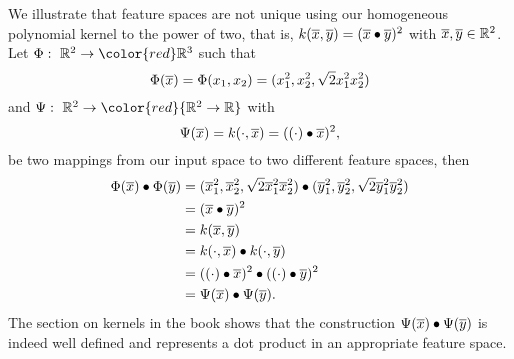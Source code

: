 \documentclass[a4paper,blends,pdf,colorBG,slideColor]{prosper}
\begin{document}
\small
We illustrate that feature spaces are not unique using our homogeneous polynomial kernel to the power of two, that is, 
$k(\overline{x},\overline{y})=(\overline{x}\bullet\overline{y})^2$ with $\overline{x}, \overline{y} \in \mathbb{R}^{2}$.
Let $\Phi\co \Rnspace{2} \rightarrow {\color{red}\Rnspace{3}}$ such that
\begin{equation*}
\Phi(\overline{x}) = \Phi(x_1,x_2)= ({x}_1^2,{x}_2^2,\sqrt{2} {x}_1^2 {x}_2^2)
\end{equation*}
and $\Psi\co \Rnspace{2} \rightarrow {\color{red}\{\Rnspace{2}\rightarrow \Real\}}$ with
\begin{equation*}
\Psi(\overline{x}) = k(\cdot,\overline{x}) = ((\cdot)\bullet\overline{x})^2,
\end{equation*}
be two mappings from our input space to two different feature spaces,
then
\begin{align*}
\Phi(\overline{x})\bullet\Phi(\overline{y}) &= (\overline{x}_1^2,\overline{x}_2^2,\sqrt{2} \overline{x}_1^2 \overline{x}_2^2)\bullet
		(\overline{y}_1^2,\overline{y}_2^2,\sqrt{2} \overline{y}_1^2 \overline{y}_2^2)\\
		& =  (\overline{x}\bullet \overline{y})^2\\
		&= k(\overline{x},\overline{y})\\
		&= k(\cdot,\overline{x})\bullet k(\cdot,\overline{y})\\
		& =  ((\cdot)\bullet\overline{x})^2 \bullet ((\cdot)\bullet\overline{y})^2\\
		& =  \Psi(\overline{x}) \bullet \Psi(\overline{y}).
\end{align*}
The section on kernels in the book shows that the construction $\Psi(\overline{x}) \bullet \Psi(\overline{y})$
is indeed well defined and represents a dot product in an appropriate feature space.
\es
\end{document}
